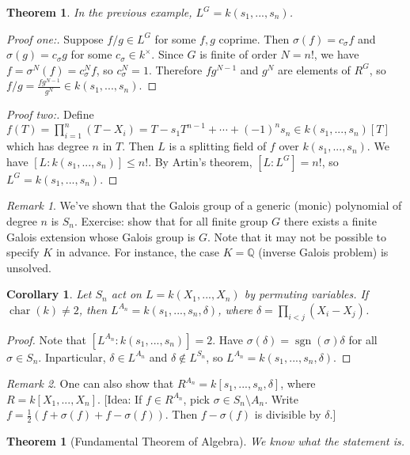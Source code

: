 \documentclass{article}
\theoremstyle{definition}
\theoremstyle{remark}
\newtheorem{rem}{Remark}
\theoremstyle{plain}
\newtheorem{thm}[defn]{Theorem}
\newtheorem{crly}[defn]{Corollary}
\newcommand{\QQ}{\mathbb{Q}}
\begin{document}
\begin{thm}
    In the previous example, $L^G=k(s_1,...,s_n)$.
\end{thm}
\begin{proof}[Proof one:]
    Suppose $f/g\in L^G$ for some $f,g$ coprime. Then $\sigma(f)=c_\sigma f$ and $\sigma(g)=c_\sigma g$ for some $c_\sigma\in k^\times$. Since $G$ is finite of order $N=n!$, we have $f=\sigma^N(f)=c_\sigma^N f$, so $c_\sigma^N=1$. Therefore $fg^{N-1}$ and $g^N$ are elements of $R^G$, so $f/g=\frac{fg^{N-1}}{g^N}\in k(s_1,...,s_n)$.
\end{proof}
\begin{proof}[Proof two:]
    Define $f(T)=\prod_{i=1}^n(T-X_i)=T-s_1T^{n-1}+\cdots+(-1)^ns_n\in k(s_1,...,s_n)[T]$ which has degree $n$ in $T$. Then $L$ is a splitting field of $f$ over $k(s_1,...,s_n)$. We have $[L:k(s_1,...,s_n)]\le n!$. By Artin's theorem, $[L:L^G]=n!$, so $L^G=k(s_1,...,s_n)$.
\end{proof}
\begin{rem}
    We've shown that the Galois group of a generic (monic) polynomial of degree $n$ is $S_n$. Exercise: show that for all finite group $G$ there exists a finite Galois extension whose Galois group is $G$. Note that it may not be possible to specify $K$ in advance. For instance, the case $K=\QQ$ (inverse Galois problem) is unsolved.
\end{rem}
\begin{crly}
    Let $S_n$ act on $L=k(X_1,...,X_n)$ by permuting variables. If $\operatorname{char}(k)\neq 2$, then $L^{A_n}=k(s_1,...,s_n,\delta)$, where $\delta=\prod_{i<j}(X_i-X_j)$.
\end{crly}
\begin{proof}
    Note that $[L^{A_n}:k(s_1,...,s_n)]=2$. Have $\sigma(\delta)=\operatorname{sgn}(\sigma)\delta$ for all $\sigma\in S_n$. Inparticular, $\delta\in L^{A_n}$ and $\delta\notin L^{S_n}$, so $L^{A_n}=k(s_1,...,s_n,\delta)$.
\end{proof}
\begin{rem}
    One can also show that $R^{A_n}=k[s_1,...,s_n,\delta]$, where $R=k[X_1,...,X_n]$. [Idea: If $f\in R^{A_n}$, pick $\sigma\in S_n\setminus A_n$. Write $f=\frac12(f+\sigma(f)+f-\sigma(f))$. Then $f-\sigma(f)$ is divisible by $\delta$.]
\end{rem}
\begin{thm}[Fundamental Theorem of Algebra]
    We know what the statement is.
\end{thm}
\end{document}
